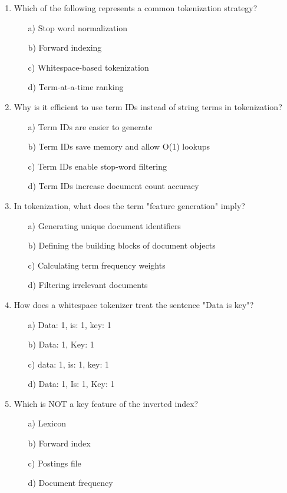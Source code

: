 \documentclass[8pt]{extarticle}
\begin{document}
\begin{multicols}{2}
\begin{enumerate}
\item Which of the following represents a common tokenization strategy?
\begin{itemize}
\item[a)] Stop word normalization
\item[b)] Forward indexing
\item[c)] Whitespace-based tokenization
\item[d)] Term-at-a-time ranking
\end{itemize}

\item Why is it efficient to use term IDs instead of string terms in tokenization?
\begin{itemize}
\item[a)] Term IDs are easier to generate
\item[b)] Term IDs save memory and allow O(1) lookups
\item[c)] Term IDs enable stop-word filtering
\item[d)] Term IDs increase document count accuracy
\end{itemize}

\item In tokenization, what does the term "feature generation" imply?
\begin{itemize}
\item[a)] Generating unique document identifiers
\item[b)] Defining the building blocks of document objects
\item[c)] Calculating term frequency weights
\item[d)] Filtering irrelevant documents
\end{itemize}

\item How does a whitespace tokenizer treat the sentence "Data is key"?
\begin{itemize}
\item[a)] {Data: 1, is: 1, key: 1}
\item[b)] {Data: 1, Key: 1}
\item[c)] {data: 1, is: 1, key: 1}
\item[d)] {Data: 1, Is: 1, Key: 1}
\end{itemize}

\item Which is NOT a key feature of the inverted index?
\begin{itemize}
\item[a)] Lexicon
\item[b)] Forward index
\item[c)] Postings file
\item[d)] Document frequency
\end{itemize}


\end{enumerate}
\end{multicols}
\end{document}
